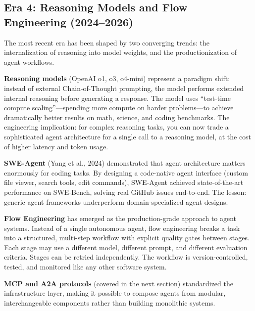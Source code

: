 \subsection{Era 4: Reasoning Models and Flow Engineering (2024--2026)}

The most recent era has been shaped by two converging trends: the internalization of reasoning into model weights, and the productionization of agent workflows.

\textbf{Reasoning models} (OpenAI o1, o3, o4-mini) represent a paradigm shift: instead of external Chain-of-Thought prompting, the model performs extended internal reasoning before generating a response. The model uses ``test-time compute scaling''---spending more compute on harder problems---to achieve dramatically better results on math, science, and coding benchmarks. The engineering implication: for complex reasoning tasks, you can now trade a sophisticated agent architecture for a single call to a reasoning model, at the cost of higher latency and token usage.

\textbf{SWE-Agent} (Yang et al., 2024) demonstrated that agent architecture matters enormously for coding tasks. By designing a code-native agent interface (custom file viewer, search tools, edit commands), SWE-Agent achieved state-of-the-art performance on SWE-Bench, solving real GitHub issues end-to-end. The lesson: generic agent frameworks underperform domain-specialized agent designs.

\textbf{Flow Engineering} has emerged as the production-grade approach to agent systems. Instead of a single autonomous agent, flow engineering breaks a task into a structured, multi-step workflow with explicit quality gates between stages. Each stage may use a different model, different prompt, and different evaluation criteria. Stages can be retried independently. The workflow is version-controlled, tested, and monitored like any other software system.

\textbf{MCP and A2A protocols} (covered in the next section) standardized the infrastructure layer, making it possible to compose agents from modular, interchangeable components rather than building monolithic systems.

